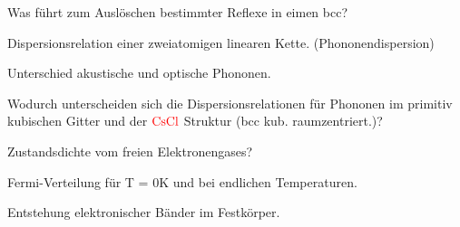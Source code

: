 \documentclass[a5paper,12pt,ngerman,grid=front %
,print
]{kartei}
\let\oldce\ce
\renewcommand*{\ce}[1]{\begingroup\color{red}\oldce{#1}\endgroup}
\begin{document}
	\begin{karte}{
		Was führt zum Auslöschen bestimmter Reflexe in eimen bcc?
		}
		
		
		
	\end{karte}


	\begin{karte}{
		Dispersionsrelation einer zweiatomigen linearen Kette. (Phononendispersion)
		}
		
		
		
	\end{karte}


	\begin{karte}{
		Unterschied akustische und optische Phononen.
		}
		
		
		
	\end{karte}


	\begin{karte}{
		Wodurch unterscheiden sich die Dispersionsrelationen für Phononen im primitiv 
		kubischen Gitter und der $\ce{CsCl}$ Struktur (bcc kub. raumzentriert.)?
		}
		
		
		
	\end{karte}


	\begin{karte}{
		Zustandsdichte vom freien Elektronengases?
		}
		
		
		
	\end{karte}


	\begin{karte}{
		Fermi-Verteilung für T = 0K und bei endlichen Temperaturen.
		}
		
		
		
	\end{karte}


	\begin{karte}{
		Entstehung elektronischer Bänder im Festkörper.
		}
		
		
		
	\end{karte}
\end{document}
